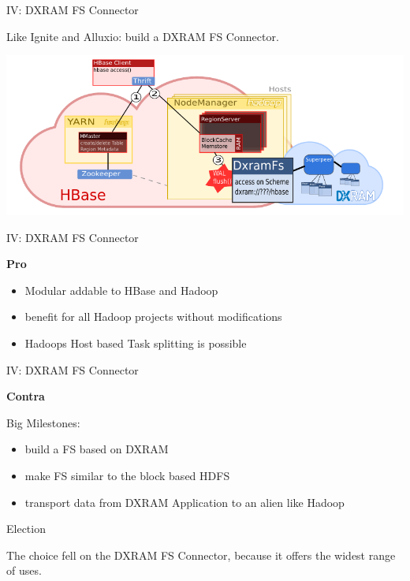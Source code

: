 \begin{frame}{IV: DXRAM FS Connector}
\protect\hypertarget{iv-dxram-fs-connector}{}

Like Ignite and Alluxio: build a DXRAM FS Connector.

\includegraphics{fig/dxramconnector.pdf}

\end{frame}

\begin{frame}{IV: DXRAM FS Connector}
\protect\hypertarget{iv-dxram-fs-connector-1}{}

\textbf{Pro}

\begin{itemize}
\tightlist
\item
  Modular addable to HBase and Hadoop
\item
  benefit for all Hadoop projects without modifications
\item
  Hadoops Host based Task splitting is possible
\end{itemize}

\end{frame}

\begin{frame}{IV: DXRAM FS Connector}
\protect\hypertarget{iv-dxram-fs-connector-2}{}

\textbf{Contra}

Big Milestones:

\begin{itemize}
\tightlist
\item
  build a FS based on DXRAM
\item
  make FS similar to the block based HDFS
\item
  transport data from DXRAM Application to an alien like Hadoop
\end{itemize}

\end{frame}

\begin{frame}{Election}
\protect\hypertarget{election}{}

The choice fell on the DXRAM FS Connector, because it offers the widest
range of uses.

\end{frame}

